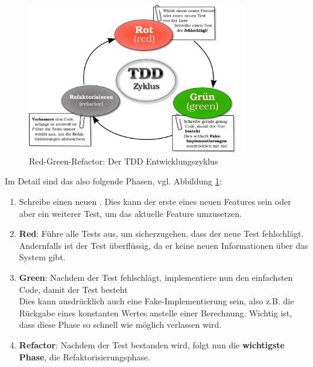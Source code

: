   \begin{figure}[htbp]
 \centering
 \includegraphics[width=0.85\textwidth]{./diagrams/red-green-refactor.pdf}
 \caption{Red-Green-Refactor: Der TDD Entwicklungszyklus}
  \label{fig:redgreenrefactor}
\end{figure}
  Im Detail sind das also folgende Phasen, vgl. Abbildung \ref{fig:redgreenrefactor}:
  \begin{enumerate}
   \item Schreibe einen neuen . Dies kann der erste eines neuen Features sein oder aber ein weiterer Test, um das aktuelle Feature umzusetzen.
   \item \textbf{Red}: Führe alle Tests aus, um sicherzugehen, dass der neue Test fehlschlägt. Andernfalls ist der Test überflüssig, da er keine neuen Informationen über das System gibt.
   \item \textbf{Green}: Nachdem der Test fehlschlägt, implementiere nun den einfachsten Code, damit der Test besteht\\
   Dies kann ausdrücklich auch eine Fake-Implementierung sein, also z.B. die Rückgabe eines konstanten Wertes anstelle einer Berechnung. Wichtig ist, dass diese Phase so schnell wie möglich verlassen wird.
   \item \textbf{Refactor}: Nachdem der Test bestanden wird, folgt nun die \textbf{wichtigste Phase}, die Refaktorisierungsphase.\\
  \end{enumerate}


